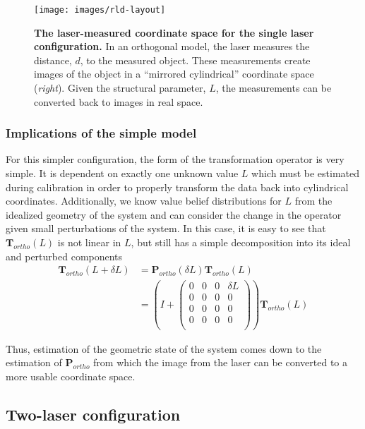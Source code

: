 \begin{figure}
  \texttt{[image: images/rld-layout]}
  \caption{\textbf{The laser-measured coordinate space for the single
      laser configuration.} In an orthogonal model, the laser measures
    the distance, $d$, to the measured object. These measurements
    create images of the object in a ``mirrored cylindrical''
    coordinate space (\textit{right}). Given the structural parameter,
    $L$, the measurements can be converted back to images in real
    space.}
  \label{fig:rld-layout}
\end{figure}

\subsubsection{Implications of the simple model}
\label{sec:impl-simple-model}

For this simpler configuration, the form of the transformation
operator is very simple. It is dependent on exactly one unknown value
$L$ which must be estimated during calibration in order to properly
transform the data back into cylindrical coordinates. Additionally, we
know value belief distributions for $L$ from the idealized geometry of
the system and can consider the change in the operator given small
perturbations of the system. In this case, it is easy to see that
$\mathbf{T}_{ortho}(L)$ is not linear in $L$, but still has a simple
decomposition into its ideal and perturbed components
\begin{align}
  \mathbf{T}_{ortho}(L + \delta L) &= \mathbf{P}_{ortho}(\delta
  L)\mathbf{T}_{ortho}(L) \\
  &= \left(I + \left(
    \begin{array}{cccc}
      0 & 0 & 0 & \delta L \\
      0 & 0 & 0 & 0 \\
      0 & 0 & 0 & 0 \\
      0 & 0 & 0 & 0 \\
    \end{array}
  \right)\right) \mathbf{T}_{ortho}(L)
\end{align}

Thus, estimation of the geometric state of the system comes down to
the estimation of $\mathbf{P}_{ortho}$ from which the image from the
laser can be converted to a more usable coordinate space.

\subsection{Two-laser configuration}
\label{sec:two-laser-conf}

